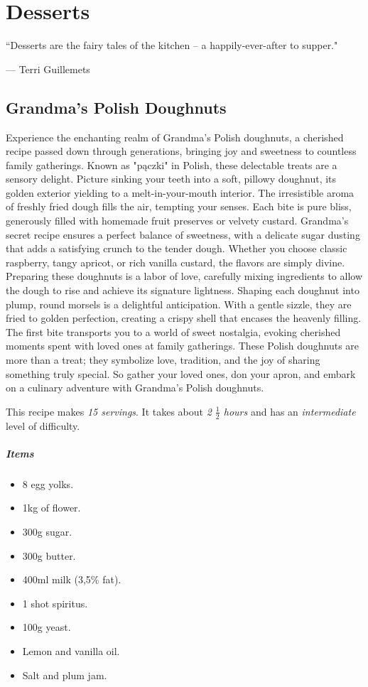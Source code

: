\chapter{Desserts}
\label{desserts}
\epigraph{``Desserts are the fairy tales of the kitchen -- a happily-ever-after to supper."}{--- \textup{Terri Guillemets}}

\clearpage
\section{Grandma's Polish Doughnuts}
\label{grandmaspolishdoughnuts}
Experience the enchanting realm of Grandma's Polish doughnuts, a cherished recipe passed down through generations, bringing joy and sweetness to countless family gatherings. Known as "pączki" in Polish, these delectable treats are a sensory delight. Picture sinking your teeth into a soft, pillowy doughnut, its golden exterior yielding to a melt-in-your-mouth interior. The irresistible aroma of freshly fried dough fills the air, tempting your senses. Each bite is pure bliss, generously filled with homemade fruit preserves or velvety custard. Grandma's secret recipe ensures a perfect balance of sweetness, with a delicate sugar dusting that adds a satisfying crunch to the tender dough. Whether you choose classic raspberry, tangy apricot, or rich vanilla custard, the flavors are simply divine. Preparing these doughnuts is a labor of love, carefully mixing ingredients to allow the dough to rise and achieve its signature lightness. Shaping each doughnut into plump, round morsels is a delightful anticipation. With a gentle sizzle, they are fried to golden perfection, creating a crispy shell that encases the heavenly filling. The first bite transports you to a world of sweet nostalgia, evoking cherished moments spent with loved ones at family gatherings. These Polish doughnuts are more than a treat; they symbolize love, tradition, and the joy of sharing something truly special. So gather your loved ones, don your apron, and embark on a culinary adventure with Grandma's Polish doughnuts.

This recipe makes \emph{15 servings}. It takes about \emph{2 $\frac{1}{2}$ hours} and has an \emph{intermediate} level of difficulty. 

\paragraph{Items}
\begin{itemize}[noitemsep]
    \item[\ding{182}] 8 egg yolks.
    \item[\ding{183}] 1kg of flower.
    \item[\ding{184}] 300g sugar.
    \item[\ding{185}] 300g butter.
    \item[\ding{186}] 400ml milk (3,5\% fat).
    \item[\ding{187}] 1 shot spiritus.
    \item[\ding{188}] 100g yeast.
    \item[\ding{189}] Lemon and vanilla oil.
    \item[\ding{190}] Salt and plum jam.
\end{itemize}

